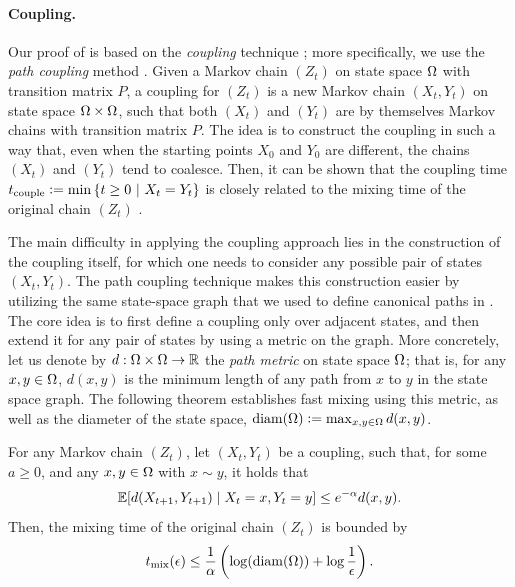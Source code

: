\paragraph{Coupling.}
Our proof of  is based on the \emph{coupling} technique \citep{aldous83}; more specifically, we use the \emph{path coupling} method \citep{bubley97,levin08,jerrum03}.
Given a Markov chain $(Z_t)$ on state space $\ss$ with transition matrix $P$, a coupling for $(Z_t)$ is a new Markov chain $(X_t, Y_t)$ on state space $\ss \times \ss$, such that both $(X_t)$ and $(Y_t)$ are by themselves Markov chains with transition matrix $P$.
The idea is to construct the coupling in such a way that, even when the starting points $X_0$ and $Y_0$ are different, the chains $(X_t)$ and $(Y_t)$ tend to coalesce.
Then, it can be shown that the coupling time $t_{\mathrm{couple}} \defeq \min\sdef{t \geq 0}{X_t = Y_t}$ is closely related to the mixing time of the original chain $(Z_t)$ \citep{levin08}.

The main difficulty in applying the coupling approach lies in the construction of the coupling itself, for which one needs to consider any possible pair of states $(X_t, Y_t)$.
The path coupling technique makes this construction easier by utilizing the same state-space graph that we used to define canonical paths in .
The core idea is to first define a coupling only over adjacent states, and then extend it for any pair of states by using a metric on the graph.
More concretely, let us denote by $d : \ss \times \ss \to \mathbb{R}$ the \emph{path metric} on state space $\ss$; that is, for any $x, y \in \ss$, $d(x, y)$ is the minimum length of any path from $x$ to $y$ in the state space graph.
The following theorem establishes fast mixing using this metric, as well as the diameter of the state space, $\mathrm{diam}(\ss) \defeq \max_{x,y \in \ss}d(x, y)$.
\begin{theorem} \label{thm:pc}
For any Markov chain $(Z_t)$, let $(X_t, Y_t)$ be a coupling, such that, for some $a \geq 0$, and any $x, y \in \ss$ with $x \sim y$, it holds that
\begin{align*}
  \E[d(X_{t+1}, Y_{t+1}) \mid X_t = x, Y_t = y] \leq e^{-\alpha}d(x, y).
\end{align*}
Then, the mixing time of the original chain $(Z_t)$ is bounded by
\begin{align*}
  \tme \leq \frac{1}{\alpha}\left(\log(\mathrm{diam}(\ss)) + \log\frac{1}{\epsilon} \right).
\end{align*}
\end{theorem}

